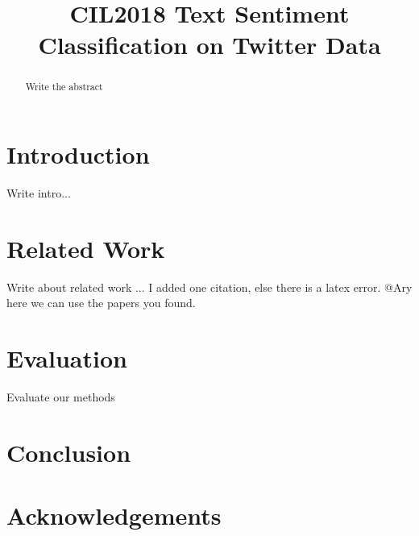 \documentclass[conference]{IEEEtran}
\begin{document}
\title{CIL2018 Text Sentiment Classification on Twitter Data}



\author{
\and
{}
\and
{}
\and
{}
}
\maketitle
{}

\begin{abstract}
Write the abstract

\end{abstract}

\section{Introduction}
Write intro...

\section{Related Work}
\label{sec:related_work}

Write about related work \cite{go2016mastering}... I added one citation, else there is a latex error. @Ary here we can use the papers you found.



\section{Evaluation}
\label{sec:evaluation}
Evaluate our methods

\section{Conclusion}

\section*{Acknowledgements}



\end{document}
